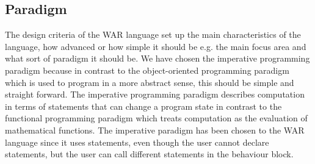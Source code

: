 \subsection{Paradigm}
The design criteria of the WAR language set up the main characteristics of the language, how advanced or how simple it should be e.g. the main focus area and what sort of paradigm it should be. We have chosen the imperative programming paradigm because in contrast to the object-oriented programming paradigm which is used to program in a more abstract sense, this should be simple and straight forward. The imperative programming paradigm describes computation in terms of statements that can change a program state in contrast to the functional programming paradigm which treats computation as the evaluation of mathematical functions. The imperative paradigm has been chosen to the WAR language since it uses statements, even though the user cannot declare statements, but the user can call different statements in the behaviour block. 


